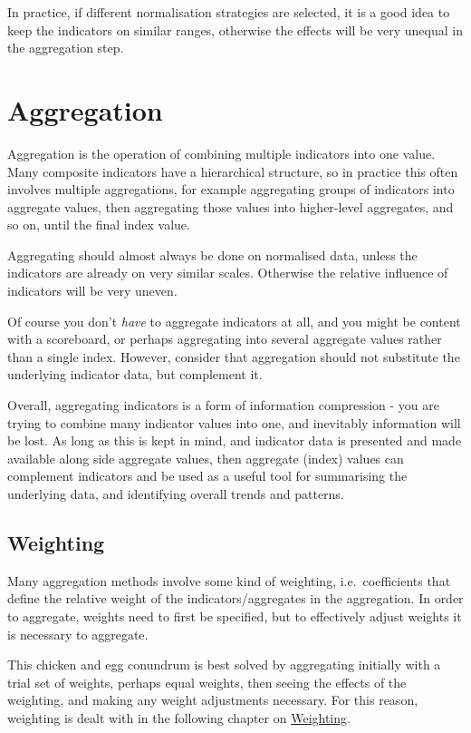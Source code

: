 \documentclass[
]{book}
\begin{document}
In practice, if different normalisation strategies are selected, it is a good idea to keep the indicators on similar ranges, otherwise the effects will be very unequal in the aggregation step.

\hypertarget{aggregation}{%
\chapter{Aggregation}\label{aggregation}}

Aggregation is the operation of combining multiple indicators into one value. Many composite indicators have a hierarchical structure, so in practice this often involves multiple aggregations, for example aggregating groups of indicators into aggregate values, then aggregating those values into higher-level aggregates, and so on, until the final index value.

Aggregating should almost always be done on normalised data, unless the indicators are already on very similar scales. Otherwise the relative influence of indicators will be very uneven.

Of course you don't \emph{have} to aggregate indicators at all, and you might be content with a scoreboard, or perhaps aggregating into several aggregate values rather than a single index. However, consider that aggregation should not substitute the underlying indicator data, but complement it.

Overall, aggregating indicators is a form of information compression - you are trying to combine many indicator values into one, and inevitably information will be lost. As long as this is kept in mind, and indicator data is presented and made available along side aggregate values, then aggregate (index) values can complement indicators and be used as a useful tool for summarising the underlying data, and identifying overall trends and patterns.

\hypertarget{weighting}{%
\section{Weighting}\label{weighting}}

Many aggregation methods involve some kind of weighting, i.e.~coefficients that define the relative weight of the indicators/aggregates in the aggregation. In order to aggregate, weights need to first be specified, but to effectively adjust weights it is necessary to aggregate.

This chicken and egg conundrum is best solved by aggregating initially with a trial set of weights, perhaps equal weights, then seeing the effects of the weighting, and making any weight adjustments necessary. For this reason, weighting is dealt with in the following chapter on \protect\hyperlink{weighting-2}{Weighting}.
\end{document}
